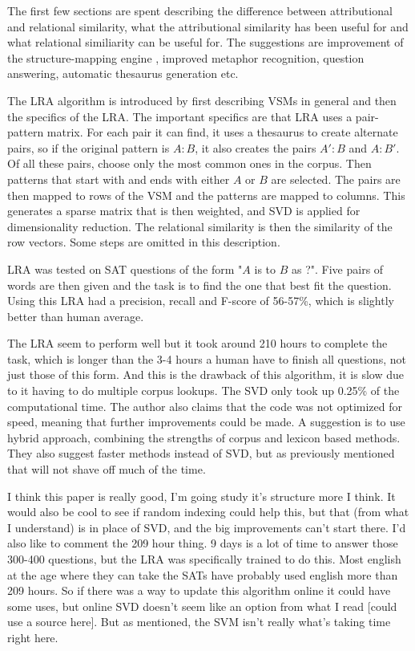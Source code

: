 \begin{review}
    The first few sections are spent describing the difference between attributional and relational similarity, what the attributional similarity has been useful for and what relational similiarity can be useful for.
    The suggestions are improvement of the structure-mapping engine \cite{Gentner1983Structure}, improved metaphor recognition, question answering, automatic thesaurus generation etc.
    
    The LRA algorithm is introduced by first describing VSMs in general and then the specifics of the LRA.
    The important specifics are that LRA uses a pair-pattern matrix.
    For each pair it can find, it uses a thesaurus to create alternate pairs, so if the original pattern is $A : B$, it also creates the pairs $A' : B$ and $A : B'$.
    Of all these pairs, choose only the most common ones in the corpus.
    Then patterns that start with and ends with either $A$ or $B$ are selected.
    The pairs are then mapped to rows of the VSM and the patterns are mapped to columns.
    This generates a sparse matrix that is then weighted, and SVD is applied for dimensionality reduction.
    The relational similarity is then the similarity of the row vectors.
    Some steps are omitted in this description.
    
    LRA was tested on SAT questions of the form "$A$ is to $B$ as ?".
    Five pairs of words are then given and the task is to find the one that best fit the question.
    Using this LRA had a precision, recall and F-score of 56-57\%, which is slightly better than human average.
    
    The LRA seem to perform well but it took around 210 hours to complete the task, which is longer than the 3-4 hours a human have to finish all questions, not just those of this form.
    And this is the drawback of this algorithm, it is slow due to it having to do multiple corpus lookups.
    The SVD only took up 0.25\% of the computational time.
    The author also claims that the code was not optimized for speed, meaning that further improvements could be made.
    A suggestion is to use hybrid approach, combining the strengths of corpus and lexicon based methods.
    They also suggest faster methods instead of SVD, but as previously mentioned that will not shave off much of the time.
    
    I think this paper is really good, I'm going study it's structure more I think.
    It would also be cool to see if random indexing could help this, but that (from what I understand) is in place of SVD, and the big improvements can't start there.
    I'd also like to comment the 209 hour thing.
    9 days is a lot of time to answer those 300-400 questions, but the LRA was specifically trained to do this.
    Most english at the age where they can take the SATs have probably used english more than 209 hours.
    So if there was a way to update this algorithm online it could have some uses, but online SVD doesn't seem like an option from what I read [could use a source here].
    But as mentioned, the SVM isn't really what's taking time right here.
    
\end{review}

